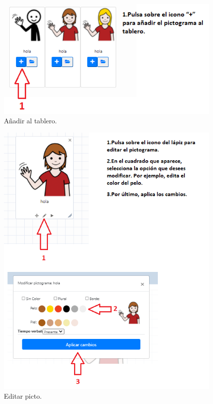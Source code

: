 \begin{figure}[h!]
	\centering
	\includegraphics[width=0.7\linewidth]{Imagenes/Bitmap/Tarea1-Pista2}
	\caption{Añadir al tablero.}
	\label{fig:tarea1-pista2}
\end{figure}

\begin{figure}[h!]
	\centering
	\includegraphics[width=0.7\linewidth]{Imagenes/Bitmap/Tarea1-Pista3}
	\caption{Editar picto.}
	\label{fig:tarea1-pista3}
\end{figure}



